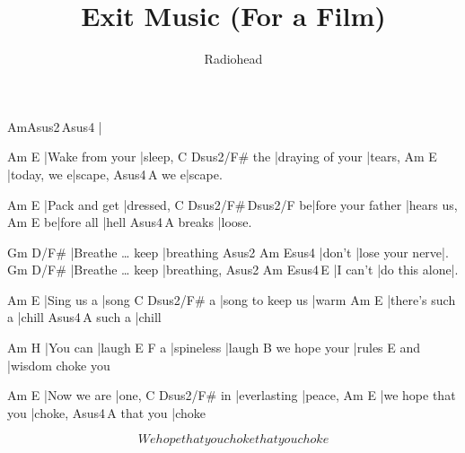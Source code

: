 \documentclass{song}
\author{Radiohead}
\title{Exit Music (For a Film)}
\begin{document}
\strophe
Am\quad{}Asus2\,Asus4
|
\endstrophe

\begin{multicols}{2}

\strophe
Am              E
|Wake from your |sleep,
    C                Dsus2/F\#
the |draying of your |tears,
Am          E
|today, we e|scape,
    Asus4\,A
we e|scape.
\endstrophe

\strophe
Am            E
|Pack and get |dressed,
  C                 Dsus2/F\#\,Dsus2/F
be|fore your father |hears us,
  Am        E
be|fore all |hell
       Asus4\,A
breaks |loose.
\endstrophe

\strophe
Gm                     D\7/F\#
|Breathe \ldots{} keep |breathing
Asus2  Am              Esus4
|don't |lose your nerve|.
Gm                     D\7/F\#
|Breathe \ldots{} keep |breathing,
Asus2    Am            Esus4\,E
|I can't |do this alone|.
\endstrophe

\columnbreak

\strophe
Am         E
|Sing us a |song
  C                Dsus2/F\#
a |song to keep us |warm
Am              E
|there's such a |chill
       Asus4\,A
such a |chill
\endstrophe

\strophe
Am       H
|You can |laugh
  E          F
a |spineless |laugh
             B
we hope your |rules
    E
and |wisdom choke you
\endstrophe

\strophe
Am          E
|Now we are |one,
   C            Dsus2/F\#
in |everlasting |peace,
Am                E
|we hope that you |choke,
         Asus4\,A
that you |choke
\endstrophe

\strophe*
\[ We hope that you choke
that you choke \]
\endstrophe

\end{multicols}

\end{document}
